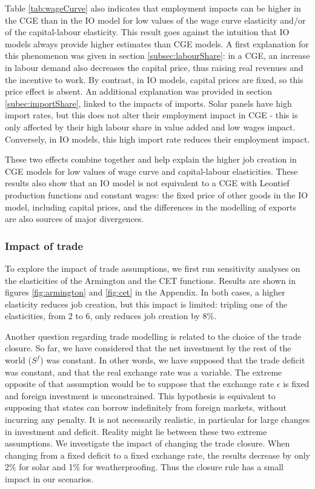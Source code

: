 Table \ref{tab:wageCurve} also indicates that employment impacts can be higher in the CGE than in the IO model for low values of the wage curve elasticity and/or of the capital-labour elasticity.
This result goes against the intuition that IO models always provide higher estimates than CGE models.
A first explanation for this phenomenon was given in section \ref{subsec:labourShare}: in a CGE, an increase in labour demand also decreases the capital price, thus raising real revenues and the incentive to work. By contrast, in IO models, capital prices are fixed, so this price effect is absent.
An additional explanation was provided in section \ref{subec:importShare}, linked to the impacts of imports. Solar panels have high import rates, but this does not alter their employment impact in CGE - this is only affected by their high labour share in value added and low wages impact. Conversely, in IO models, this high import rate reduces their employment impact.

These two effects combine together and help explain the higher job creation in CGE models for low values of wage curve and capital-labour elasticities. These results also show that an IO model is not equivalent to a CGE with Leontief production functions and constant wages: the fixed price of other goods in the IO model, including capital prices, and the differences in the modelling of exports are also sources of major divergences.

\subsubsection{Impact of trade}
To explore the impact of trade assumptions, we first run sensitivity analyses on the elasticities of the Armington and the CET functions. Results are shown in figures \ref{fig:armington} and \ref{fig:cet} in the Appendix.
In both cases, a higher elasticity reduces job creation, but this impact is limited: tripling one of the elasticities, from 2 to 6, only reduces job creation by 8\%.

Another question regarding trade modelling is related to the choice of the trade closure. So far, we have considered that the net investment by the rest of the world ($S^f$) was constant. In other words, we have supposed that the trade deficit was constant, and that the real exchange rate was a variable.
The extreme opposite of that assumption would be to suppose that the exchange rate $\epsilon$ is fixed and foreign investment is unconstrained. This hypothesis is equivalent to supposing that states can borrow indefinitely from foreign markets, without incurring any penalty. It is not necessarily realistic, in particular for large changes in investment and deficit. Reality might lie between these two extreme assumptions. 
We investigate the impact of changing the trade closure. When changing from a fixed deficit to a fixed exchange rate, the results decrease by only 2\% for solar and 1\% for weatherproofing. Thus the closure rule has a small impact in our scenarios.

